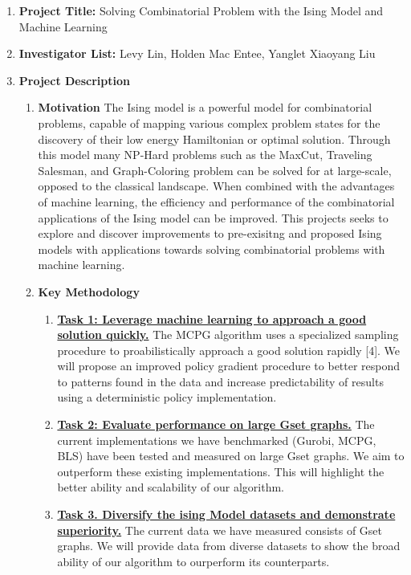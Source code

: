 \documentclass{article}
\begin{document}
\begin{enumerate}
\item \textbf{Project Title:} Solving Combinatorial Problem with the Ising Model and Machine Learning

\item \textbf{Investigator List:} Levy Lin, Holden Mac Entee, Yanglet Xiaoyang Liu

\item \textbf{Project Description}
\begin{enumerate}
	\item \textbf{Motivation}
	\newline
	The Ising model is a powerful model for combinatorial problems, capable of mapping various complex problem states for the discovery of their low energy Hamiltonian or optimal solution. Through this model many NP-Hard problems such as the MaxCut, Traveling Salesman, and Graph-Coloring problem can be solved for at large-scale, opposed to the classical landscape. When combined with the advantages of machine learning, the efficiency and performance of the combinatorial applications of the Ising model can be improved. This projects seeks to explore and discover improvements to pre-exisitng and proposed Ising models with applications towards solving combinatorial problems with machine learning. 

	\item \textbf{Key Methodology}
		
	\begin{enumerate}
			
		\item \textbf{\underline{Task 1: Leverage machine learning to approach a good solution quickly.}} The MCPG algorithm uses a specialized sampling procedure to proabilistically approach a good solution rapidly [4]. We will propose an improved policy gradient procedure to better respond to patterns found in the data and increase predictability of results using a deterministic policy implementation.

		\item \textbf{\underline{Task 2: Evaluate performance on large Gset graphs.}} The current implementations we have benchmarked (Gurobi, MCPG, BLS) have been tested and measured on large Gset graphs. We aim to outperform these existing implementations. This will highlight the better ability and scalability of our algorithm.

		\item \textbf{\underline{Task 3. Diversify the ising Model datasets and demonstrate superiority.}} The current data we have measured consists of Gset graphs. We will provide data from diverse datasets to show the broad ability of our algorithm to ourperform its counterparts. 


\end{enumerate}
\end{enumerate}
\end{enumerate}
\end{document}

